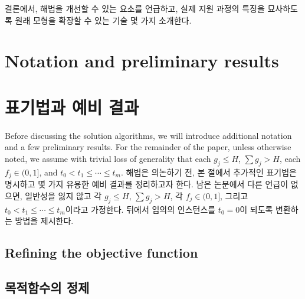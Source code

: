 \documentclass[11pt]{article} %
\theoremstyle{definition}
\theoremstyle{definition}
\begin{document}
결론에서, 해법을 개선할 수 있는 요소를 언급하고, 실제 지원 과정의 특징을 묘사하도록 원래 모형을 확장할 수 있는 기술 몇 가지 소개한다.
\fi



\ifen \section{Notation and preliminary results} \else \section{표기법과 예비 결과}\fi\label{preliminaries}
\ifen Before discussing the solution algorithms, we will introduce additional notation and a few preliminary results. For the remainder of the paper, unless otherwise noted, we assume with trivial loss of generality that each $g_j \leq H$, $\sum g_j > H$, each $f_j \in (0, 1]$, and $t_0 < t_1 \leq \cdots \leq t_m$. %
\else
해법은 의논하기 전, 본 절에서 추가적인 표기법은 명시하고 몇 가지 유용한 예비 결과를 정리하고자 한다. 남은 논문에서 다른 언급이 없으면, 일반성을 잃지 않고 각 $g_j \leq H$, $\sum g_j > H$, 각 $f_j \in (0, 1]$, 그리고 $t_0 < t_1 \leq \cdots \leq t_m$이라고 가정한다. 뒤에서 임의의 인스턴스를 $t_0 = 0$이 되도록 변환하는 방법을 제시한다. %
\fi

\ifen \subsection{Refining the objective function} \else \subsection{목적함수의 정제} \fi
\end{document}
